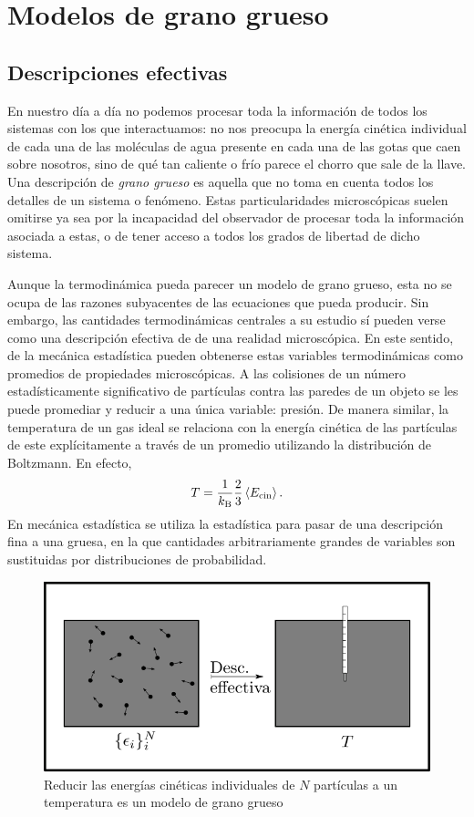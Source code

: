 \section{Modelos de grano grueso}\label{sec:Ch1CG}

\subsection{Descripciones efectivas}




En nuestro día a día no podemos procesar toda la información de todos los sistemas con los que interactuamos: no nos preocupa la energía cinética individual de cada una de las moléculas de agua presente en cada una de las gotas que caen sobre nosotros, sino de qué tan caliente o frío parece el chorro que sale de la llave. Una descripción de \textit{grano grueso} es aquella que no toma en cuenta todos los detalles de un sistema o fenómeno. Estas particularidades microscópicas suelen omitirse ya sea por la incapacidad del observador de procesar toda la información asociada a estas, o de tener acceso a todos los grados de libertad de dicho sistema.

Aunque la termodinámica pueda parecer un modelo de grano grueso, esta no se ocupa de las razones subyacentes de las ecuaciones que pueda producir. Sin embargo, las cantidades termodinámicas centrales a su estudio sí pueden verse como una descripción efectiva de de una realidad microscópica. En este sentido, de la mecánica estadística pueden obtenerse estas variables termodinámicas como promedios de propiedades microscópicas. A las colisiones de un número estadísticamente significativo de partículas contra las paredes de un objeto se les puede promediar y reducir a una única variable: presión. De manera similar, la temperatura de un gas ideal se relaciona con la energía cinética de las partículas de este explícitamente a través de un promedio utilizando la distribución de Boltzmann. En efecto, 
\begin{equation}
    T=\frac{1}{k_\text{B}}\frac{2}{3}\expval{E_{\text{cin}}}.
\end{equation}
En mecánica estadística se utiliza la estadística para pasar de una descripción fina a una gruesa, en la que cantidades arbitrariamente grandes de variables son sustituidas por distribuciones de probabilidad.
\begin{figure}[ht]
    \centering
    \includegraphics[width=0.6\linewidth]{chapter1/figures/CGT.png}
    \caption{Reducir las energías cinéticas individuales de $N$ partículas a un temperatura es un modelo de grano grueso}
    \label{fig:KtoT}
\end{figure}

